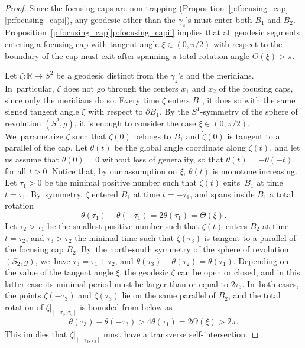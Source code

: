 \documentclass[11pt]{article}
\newcommand{\R}{\mathbb{R}}
\theoremstyle{plain}
\theoremstyle{definition}
\begin{document}
\begin{proof}
Since the focusing caps are non-trapping (Proposition~\ref{p:focusing_cap}\eqref{p:focusing_capi}), any geodesic other than the $\gamma_z$'s must enter both $B_1$ and $B_2$. Proposition~\ref{p:focusing_cap}\eqref{p:focusing_capii} implies that all geodesic segments entering a focusing cap with tangent angle $\xi\in(0,\pi/2)$ with respect to the boundary of the cap must exit after spanning a total rotation angle $\Theta(\xi)>\pi$.

Let $\zeta:\R\to S^2$ be a geodesic distinct from the $\gamma_z$'s and the meridians. In~particular, $\zeta$ does not go through the centers $x_1$ and $x_2$ of the focusing caps, since only the meridians do so. Every time $\zeta$ enters $B_1$, it does so with the same signed tangent angle $\xi$ with respect to $\partial B_1$.
By the $S^1$-symmetry of the sphere of revolution $(S^2,g)$, it is enough to consider the case $\xi\in(0,\pi/2)$. We~parametrize $\zeta$ such that $\zeta(0)$ belongs to $B_1$ and $\dot\zeta(0)$ is tangent to a parallel of the cap. Let $\theta(t)$ be the global angle coordinate along $\zeta(t)$, and let us assume that $\theta(0)=0$ without loss of generality, so that $\theta(t)=-\theta(-t)$ for all $t>0$. Notice that, by our assumption on $\xi$, $\theta(t)$ is monotone increasing. Let $\tau_1>0$ be the minimal positive number such that $\zeta(t)$ exits~$B_1$ at time $t=\tau_1$. By~symmetry, $\zeta$ entered $B_1$ at time $t=-\tau_1$, and spans inside $B_1$ a total rotation
\[
\theta(\tau_1)-\theta(-\tau_1)=2\theta(\tau_1)=\Theta(\xi).
\]
Let $\tau_2>\tau_1$ be the smallest positive number such that $\zeta(t)$ enters $B_2$ at time $t=\tau_2$, and $\tau_3>\tau_2$ the minimal time such that $\dot\zeta(\tau_3)$ is tangent to a parallel of the focusing cap $B_2$. By~the north-south symmetry of the sphere of revolution $(S_2,g)$, we~have $\tau_3=\tau_1+\tau_2$, and $\theta(\tau_3)-\theta(\tau_2)=\theta(\tau_1)$. Depending on the value of the tangent angle $\xi$, the geodesic $\zeta$ can be open or closed, and in this latter case its minimal period must be larger than or equal to $2\tau_3$. In~both cases, the points $\zeta(-\tau_3)$ and $\zeta(\tau_3)$ lie on the same parallel of $B_2$, and the total rotation of $\zeta|_{[-\tau_3,\tau_3]}$ is bounded from below as
\begin{align*}
\theta(\tau_3)-\theta(-\tau_3)
>
4\theta(\tau_1)
=
2\Theta(\xi)
>2\pi.
\end{align*}
This implies that $\zeta|_{[-\tau_3,\tau_3]}$ must have a transverse self-intersection.
\end{proof}
\end{document}
